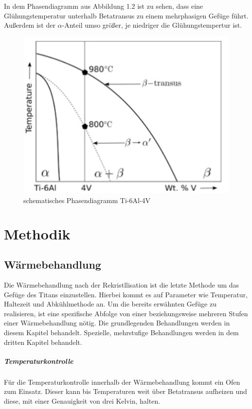 \documentclass[a4paper, singlepage, 11pt]{tubsreprt}
\begin{document}
In dem Phasendiagramm aus Abbildung 1.2 ist zu sehen, dass eine Glühungstemperatur unterhalb Betatransus zu einem mehrphasigen Gefüge führt. Außerdem ist der $\alpha$-Anteil umso größer, je niedriger die Glühungstempertur ist. 
\begin{figure}
	\centering
	\includegraphics[scale=0.9]{Bilder/Phasendiagram.PNG}
	\caption[Phasendiagramm]{schematisches Phasendiagramm Ti-6Al-4V \cite{Babu2008}}
	\label{fig2}
\end{figure}

\chapter{Methodik}
\section{Wärmebehandlung}

Die Wärmebehandlung nach der Rekristllisation ist die letzte Methode um das Gefüge des Titans einzustellen. Hierbei kommt es auf Parameter wie Temperatur, Haltezeit und Abkühlmethode an. Um die bereits erwähnten Gefüge zu realisieren, ist eine spezifische Abfolge von einer beziehungsweise mehreren Stufen einer Wärmebehandlung nötig. Die grundlegenden Behandlungen werden in diesem Kapitel behandelt. Spezielle, mehrstufige Behandlungen werden in dem dritten Kapitel behandelt.
\paragraph{Temperaturkontrolle}
Für die Temperaturkontrolle innerhalb der Wärmebehandlung kommt ein Ofen zum Einsatz. Dieser kann bis Temperaturen weit über Betatransus aufheizen und diese, mit einer Genauigkeit von drei Kelvin, halten. 
\end{document}
